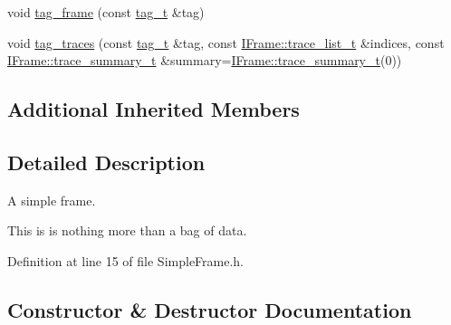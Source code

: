 \begin{DoxyCompactItemize}
\item 
void \hyperlink{class_wire_cell_1_1_simple_frame_aaa71e980a3b4467a9ed05af3e5f45f03}{tag\+\_\+frame} (const \hyperlink{class_wire_cell_1_1_i_frame_ae206ba618e10f398625dfeb675a4215a}{tag\+\_\+t} \&tag)
\item 
void \hyperlink{class_wire_cell_1_1_simple_frame_a106f413268020b6ea2a87364089bd65c}{tag\+\_\+traces} (const \hyperlink{class_wire_cell_1_1_i_frame_ae206ba618e10f398625dfeb675a4215a}{tag\+\_\+t} \&tag, const \hyperlink{class_wire_cell_1_1_i_frame_a12f08adf79d21cb9b4862a16193fda8f}{I\+Frame\+::trace\+\_\+list\+\_\+t} \&indices, const \hyperlink{class_wire_cell_1_1_i_frame_ad65f8b090c2607591e44d7b40777517e}{I\+Frame\+::trace\+\_\+summary\+\_\+t} \&summary=\hyperlink{class_wire_cell_1_1_i_frame_ad65f8b090c2607591e44d7b40777517e}{I\+Frame\+::trace\+\_\+summary\+\_\+t}(0))
\end{DoxyCompactItemize}
\subsection*{Additional Inherited Members}


\subsection{Detailed Description}
A simple frame.

This is is nothing more than a bag of data. 

Definition at line 15 of file Simple\+Frame.\+h.



\subsection{Constructor \& Destructor Documentation}
\mbox{\label{class_wire_cell_1_1_simple_frame_aae6b1f1cf7b2f1fcd5f57608366eb862}} 
